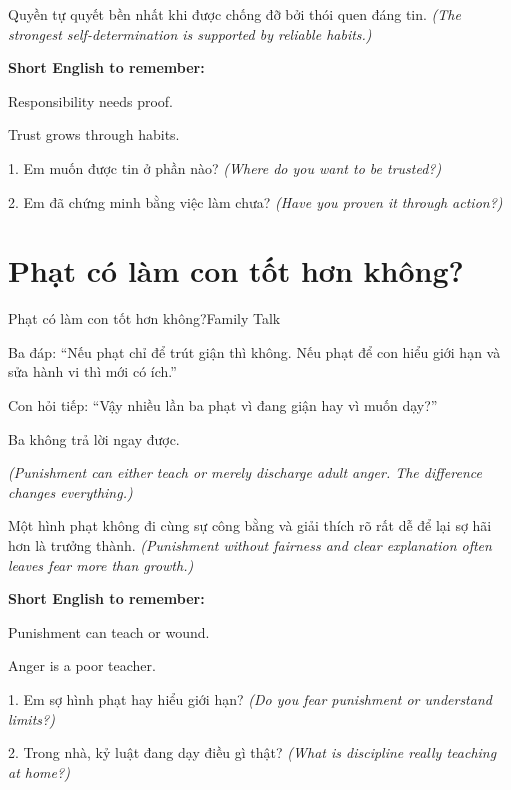 \begin{baihoc}
Quyền tự quyết bền nhất khi được chống đỡ bởi thói quen đáng tin.
\textit{(The strongest self-determination is supported by reliable habits.)}
\end{baihoc}

\begin{ghinhoanh}
\textbf{Short English to remember:}

Responsibility needs proof.

Trust grows through habits.
\end{ghinhoanh}

\begin{tuhocnhanh}
1. Em muốn được tin ở phần nào? \textit{(Where do you want to be trusted?)}

2. Em đã chứng minh bằng việc làm chưa? \textit{(Have you proven it through action?)}
\end{tuhocnhanh}
\ngancach

\section{Phạt có làm con tốt hơn không?}
\begin{truyen}{Phạt có làm con tốt hơn không?}{Family Talk}

Ba đáp: ``Nếu phạt chỉ để trút giận thì không. Nếu phạt để con hiểu giới hạn và sửa hành vi thì mới có ích.''

Con hỏi tiếp: ``Vậy nhiều lần ba phạt vì đang giận hay vì muốn dạy?''

Ba không trả lời ngay được.

\textit{(Punishment can either teach or merely discharge adult anger. The difference changes everything.)}
\end{truyen}

\begin{baihoc}
Một hình phạt không đi cùng sự công bằng và giải thích rõ rất dễ để lại sợ hãi hơn là trưởng thành.
\textit{(Punishment without fairness and clear explanation often leaves fear more than growth.)}
\end{baihoc}

\begin{ghinhoanh}
\textbf{Short English to remember:}

Punishment can teach or wound.

Anger is a poor teacher.
\end{ghinhoanh}

\begin{tuhocnhanh}
1. Em sợ hình phạt hay hiểu giới hạn? \textit{(Do you fear punishment or understand limits?)}

2. Trong nhà, kỷ luật đang dạy điều gì thật? \textit{(What is discipline really teaching at home?)}
\end{tuhocnhanh}
\ngancach

